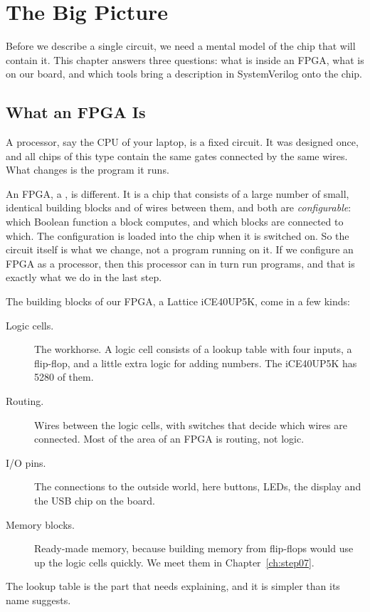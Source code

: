 \chapter{The Big Picture}
\label{ch:overview}

Before we describe a single circuit, we need a mental model of the chip that
will contain it. This chapter answers three questions: what is inside an FPGA,
what is on our board, and which tools bring a description in SystemVerilog onto
the chip.

\section{What an FPGA Is}
\label{sec:fpga}

A processor, say the CPU of your laptop, is a fixed circuit. It was designed
once, and all chips of this type contain the same gates connected by the same
wires. What changes is the program it runs.

An FPGA, a , is different. It is a chip
that consists of a large number of small, identical building blocks and of
wires between them, and both are \emph{configurable}: which Boolean function a
block computes, and which blocks are connected to which. The configuration is
loaded into the chip when it is switched on. So the circuit itself is what we
change, not a program running on it. If we configure an FPGA as a processor,
then this processor can in turn run programs, and that is exactly what we do
in the last step.

The building blocks of our FPGA, a Lattice iCE40UP5K, come in a few kinds:
\begin{description}
\item[Logic cells.] The workhorse. A logic cell consists of a lookup table with
  four inputs, a flip-flop, and a little extra logic for adding numbers. The
  iCE40UP5K has 5280 of them.
\item[Routing.] Wires between the logic cells, with switches that decide which
  wires are connected. Most of the area of an FPGA is routing, not logic.
\item[I/O pins.] The connections to the outside world, here buttons, LEDs, the
  display and the USB chip on the board.
\item[Memory blocks.] Ready-made memory, because building memory from
  flip-flops would use up the logic cells quickly. We meet them in
  Chapter~\ref{ch:step07}.
\end{description}
The lookup table is the part that needs explaining, and it is simpler than its
name suggests.

